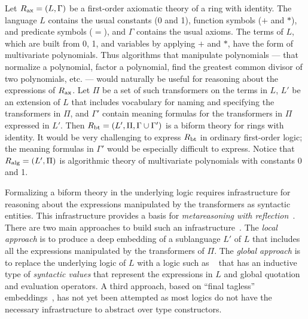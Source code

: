 \documentclass[fleqn]{llncs}
\begin{document}
\begin{example}
Let $R_{\rm ax} = (L,\Gamma)$ be a first-order axiomatic theory of a
ring with identity.  The language $L$ contains the usual constants (0
and 1), function symbols ($+$ and $*$), and predicate symbols ($=$),
and $\Gamma$ contains the usual axioms.  The terms of $L$, which are
built from 0, 1, and variables by applying $+$ and $*$, have the form
of multivariate polynomials.  Thus algorithms that manipulate
polynomials --- that normalize a polynomial, factor a polynomial, find
the greatest common divisor of two polynomials, etc. --- would
naturally be useful for reasoning about the expressions of $R_{\rm
  ax}$.  Let $\Pi$ be a set of such transformers on the terms in $L$,
$L'$ be an extension of $L$ that includes vocabulary for naming and
specifying the transformers in $\Pi$, and $\Gamma'$ contain meaning
formulas for the transformers in $\Pi$ expressed in $L'$.  Then
$R_{\rm bt} = (L',\Pi,\Gamma \cup \Gamma')$ is a biform theory for
rings with identity.  It would be very challenging to express $R_{\rm
  bt}$ in ordinary first-order logic; the meaning formulas in
$\Gamma'$ would be especially difficult to express.  Notice that
$R_{\rm alg} = (L',\Pi)$ is algorithmic theory of multivariate
polynomials with constants 0 and 1.
\end{example}

Formalizing a biform theory in the underlying logic requires
infrastructure for reasoning about the expressions manipulated by the
transformers as syntactic entities.  This infrastructure provides a
basis for \emph{metareasoning with reflection}~\cite{Farmer18}.
There are two main approaches to build such an
infrastructure~\cite{Farmer13}.  The \emph{local approach} is to
produce a deep embedding of a sublanguage $L'$ of $L$ that includes
all the expressions manipulated by the transformers of $\Pi$.  The
\emph{global approach} is to replace the underlying logic of $L$ with
a logic such as \churchqe~\cite{Farmer18} that has an inductive
type of \emph{syntactic values} that represent the expressions in $L$
and global quotation and evaluation operators.  A third approach,
based on ``final tagless'' embeddings~\cite{CaretteKS09}, has not yet
been attempted as most logics do not have the necessary infrastructure
to abstract over type constructors.
\end{document}
